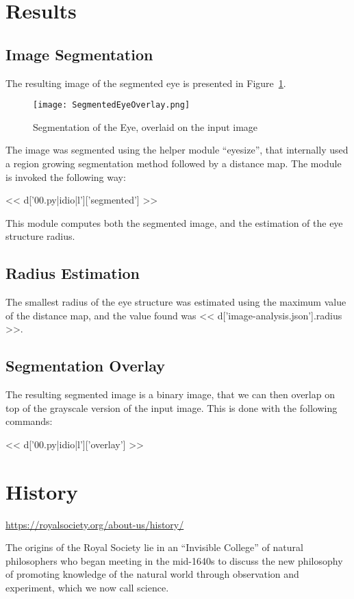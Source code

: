 \documentclass{article}
\begin{document}
\section{Results}

\subsection{Image Segmentation}

The resulting image of the segmented eye is presented in Figure~\ref{segmentedimage}.

\begin{figure}
\centering
\texttt{[image: SegmentedEyeOverlay.png]}
\caption{Segmentation of the Eye, overlaid on the input image}
\label{segmentedimage}
\end{figure}

The image was segmented using the helper module ``eyesize'', that internally
used a region growing segmentation method followed by a distance map. The
module is invoked the following way:

<< d['00.py|idio|l']['segmented'] >>

This module computes both the segmented image, and the estimation of the eye
structure radius.

\subsection{Radius Estimation}

The smallest radius of the eye structure was estimated using the maximum value
of the distance map, and the value found was << d['image-analysis.json'].radius >>.

\subsection{Segmentation Overlay}

The resulting segmented image is a binary image, that we can then overlap on
top of the grayscale version of the input image. This is done with the
following commands:

<< d['00.py|idio|l']['overlay'] >>


\section{History}

\url{https://royalsociety.org/about-us/history/}

The origins of the Royal Society lie in an ``Invisible College'' of natural
philosophers who began meeting in the mid-1640s to discuss the new philosophy
of promoting knowledge of the natural world through observation and experiment,
which we now call science.
\end{document}
